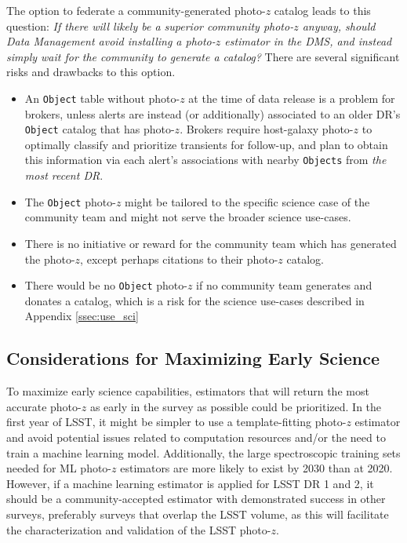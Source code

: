 \documentclass[DM,lsstdraft,toc]{lsstdoc}
\begin{document}
The option to federate a community-generated photo-$z$ catalog leads to this question: {\it If there will likely be a superior community photo-$z$ anyway, should Data Management avoid installing a photo-$z$ estimator in the DMS, and instead simply wait for the community to generate a catalog?}
There are several significant risks and drawbacks to this option.
\vspace{-15pt}
\begin{itemize}
\item An {\tt Object} table without photo-$z$ at the time of data release is a problem for brokers, unless alerts are instead (or additionally) associated to an older DR's {\tt Object} catalog that has photo-$z$. Brokers require host-galaxy photo-$z$ to optimally classify and prioritize transients for follow-up, and plan to obtain this information via each alert's associations with nearby {\tt Objects} from {\it the most recent DR}.
\item The {\tt Object} photo-$z$ might be tailored to the specific science case of the community team and might not serve the broader science use-cases.
\item There is no initiative or reward for the community team which has generated the photo-$z$, except perhaps citations to their photo-$z$ catalog.
\item There would be no {\tt Object} photo-$z$ if no community team generates and donates a catalog, which is a risk for the science use-cases described in Appendix \ref{ssec:use_sci}
\end{itemize}

\subsection{Considerations for Maximizing Early Science}\label{ssec:use_LOY1}

To maximize early science capabilities, estimators that will return the most accurate photo-$z$ as early in the survey as possible could be prioritized.
In the first year of LSST, it might be simpler to use a template-fitting photo-$z$ estimator and avoid potential issues related to computation resources and/or the need to train a machine learning model.
Additionally, the large spectroscopic training sets needed for ML photo-$z$ estimators are more likely to exist by 2030 than at 2020.
However, if a machine learning estimator is applied for LSST DR 1 and 2, it should be a community-accepted estimator with demonstrated success in other surveys, preferably surveys that overlap the LSST volume, as this will facilitate the characterization and validation of the LSST photo-$z$.
\end{document}
